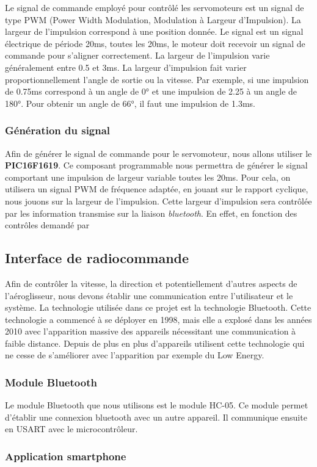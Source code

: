\documentclass[a4paper,12pt]{report}
\begin{document}
			Le signal de commande employé pour contrôlé les servomoteurs est un signal de type PWM (Power Width Modulation, Modulation à Largeur d'Impulsion). La largeur de l'impulsion correspond à une position donnée. Le signal est un signal électrique de période 20ms, toutes les 20ms, le moteur doit recevoir un signal de commande pour s'aligner correctement. La largeur de l'impulsion varie généralement entre 0.5 et 3ms. La largeur d'impulsion fait varier proportionnellement l'angle de sortie ou la vitesse. Par exemple, si une impulsion de 0.75ms correspond à un angle de 0° et une impulsion de 2.25 à un angle de 180°. Pour obtenir un angle de 66°, il faut une impulsion de 1.3ms.   
			\subsubsection{Génération du signal}
			Afin de générer le signal de commande pour le servomoteur, nous allons utiliser le \textbf{PIC16F1619}. Ce composant programmable nous permettra de générer le signal comportant une impulsion de largeur variable toutes les 20ms. Pour cela, on utilisera un signal PWM de fréquence adaptée, en jouant sur le rapport cyclique, nous jouons sur la largeur de l'impulsion. Cette largeur d'impulsion sera contrôlée par les information transmise sur la liaison \textit{bluetooth}. En effet, en fonction des contrôles demandé par 
		\subsection{Interface de radiocommande}
			Afin de contrôler la vitesse, la direction et potentiellement d'autres aspects de l'aéroglisseur, nous devons établir une communication entre l'utilisateur et le système. La technologie utilisée dans ce projet est la technologie Bluetooth. Cette technologie a commencé à se déployer en 1998, mais elle a explosé dans les années 2010 avec l'apparition massive des appareils nécessitant une communication à faible distance. Depuis de plus en plus d'appareils utilisent cette technologie qui ne cesse de s'améliorer avec l'apparition par exemple du Low Energy.
			\subsubsection{Module Bluetooth}
			Le module Bluetooth que nous utilisons est le module HC-05. Ce module permet d'établir une connexion bluetooth avec un autre appareil. Il communique ensuite en USART avec le microcontrôleur.
			\subsubsection{Application smartphone}
	
\end{document}
